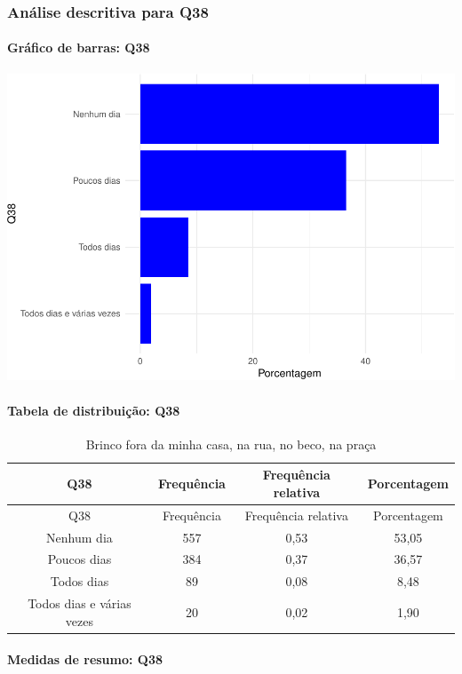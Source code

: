 \documentclass[]{article}
\let\oldparagraph\paragraph
\renewcommand{\paragraph}[1]{\oldparagraph{#1}\mbox{}}
\begin{document}
\hypertarget{anuxe1lise-descritiva-para-q38}{%
\subsubsection{Análise descritiva para Q38}\label{anuxe1lise-descritiva-para-q38}}

\hypertarget{gruxe1fico-de-barras-q38}{%
\paragraph{Gráfico de barras: Q38}\label{gruxe1fico-de-barras-q38}}

\begin{center}\includegraphics[width=0.75\linewidth]{relatorio_covid19_files/figure-latex/unnamed-chunk-1426-1} \end{center}

\hypertarget{tabela-de-distribuiuxe7uxe3o-q38}{%
\paragraph{Tabela de distribuição: Q38}\label{tabela-de-distribuiuxe7uxe3o-q38}}

\begin{longtable}[]{@{}cccc@{}}
\caption{\label{tab:unnamed-chunk-1427}Brinco fora da minha casa, na rua, no beco, na praça}\tabularnewline
\toprule
Q38 & Frequência & Frequência relativa & Porcentagem\tabularnewline
\midrule
\endfirsthead
\toprule
Q38 & Frequência & Frequência relativa & Porcentagem\tabularnewline
\midrule
\endhead
Nenhum dia & 557 & 0,53 & 53,05\tabularnewline
Poucos dias & 384 & 0,37 & 36,57\tabularnewline
Todos dias & 89 & 0,08 & 8,48\tabularnewline
Todos dias e várias vezes & 20 & 0,02 & 1,90\tabularnewline
\bottomrule
\end{longtable}

\hypertarget{medidas-de-resumo-q38}{%
\paragraph{Medidas de resumo: Q38}\label{medidas-de-resumo-q38}}
\end{document}
